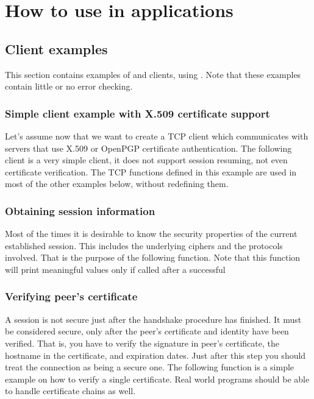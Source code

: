 \chapter{How to use \gnutls{} in applications}



\label{examples}
\section{Client examples}
This section contains examples of \tls{} and \ssl{} clients, using \gnutls{}. 
Note that these examples contain little or no error checking.

\subsection{Simple client example with X.509 certificate support}
Let's assume now that we want to create a TCP client which communicates
with servers that use X.509 or OpenPGP certificate authentication. The following client
is a very simple \tls{} client, it does not support session resuming, not
even certificate verification. The TCP functions defined in this example
are used in most of the other examples below, without redefining them.


\subsection{Obtaining session information}
Most of the times it is desirable to know the security properties of
the current established session. This includes the underlying ciphers and
the protocols involved. That is the purpose of the following function.
Note that this function will print meaningful values only if
called after a successful 



\subsection{Verifying peer's certificate}
A \tls{} session is not secure just after the handshake procedure has finished.
It must be considered secure, only after the peer's certificate and identity have been
verified. That is, you have to verify the signature in peer's 
certificate, the hostname in the certificate, and expiration dates.
Just after this step you should treat the connection as being a secure one.
The following function is a simple example on how to verify a single certificate.
Real world programs should be able to handle certificate chains as well.

